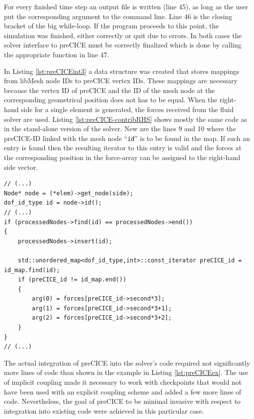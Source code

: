    For every finished time step an output file is written (line 45), as long as the user put the corresponding argument to the command line. Line 46 is the closing bracket of the big while-loop. If the program proceeds to this point, the simulation was finished, either correctly or quit due to errors. In both cases the solver interface to preCICE must be correctly finalized which is done by calling the appropriate function in line 47.
   
   In Listing \ref{lst:preCICEint3} a data structure was created that stores mappings from libMesh node IDs to preCICE vertex IDs. These mappings are necessary because the vertex ID of preCICE and the ID of the mesh node at the corresponding geometrical position does not has to be equal. When the right-hand side for a single element is generated, the forces received from the fluid solver are used. Listing \ref{lst:preCICE-contribRHS} shows mostly the same code as in the stand-alone version of the solver. New are the lines 9 and 10 where the preCICE-ID linked with the mesh node ``\texttt{id}'' is to be found in the map. If such an entry is found then the resulting iterator to this entry is valid and the forces at the corresponding position in the force-array can be assigned to the right-hand side vector.   
\begin{lstlisting}[caption=Modification of contribRHS-function,label=lst:preCICE-contribRHS,keepspaces=true]
// (...)
Node* node = (*elem)->get_node(side);
dof_id_type id = node->id();
// (...)
if (processedNodes->find(id) == processedNodes->end())
{
	processedNodes->insert(id);

	std::unordered_map<dof_id_type,int>::const_iterator preCICE_id = id_map.find(id);
	if (preCICE_id != id_map.end())
	{
		arg(0) = forces[preCICE_id->second*3];
		arg(1) = forces[preCICE_id->second*3+1];
		arg(2) = forces[preCICE_id->second*3+2];
	}
}
// (...)
\end{lstlisting}   
   The actual integration of preCICE into the solver's code required not significantly more lines of code than shown in the example in Listing \ref{lst:preCICEex}. The use of implicit coupling made it necessary to work with checkpoints that would not have been used with an explicit coupling scheme and added a few more lines of code. Nevertheless, the goal of preCICE to be minimal invasive with respect to integration into existing code were achieved in this particular case.
\newpage